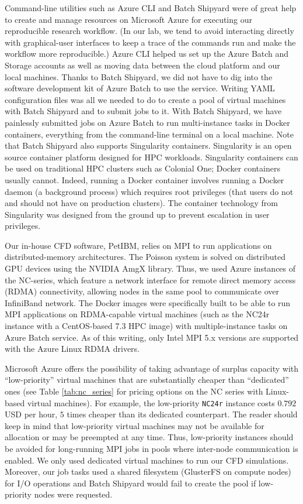 \documentclass[10pt,journal,compsoc]{IEEEtran}
\begin{document}
Command-line utilities such as Azure CLI and Batch Shipyard were of great help to create and manage resources on Microsoft Azure for executing our reproducible research workflow.
(In our lab, we tend to avoid interacting directly with graphical-user interfaces to keep a trace of the commands run and make the workflow more reproducible.)
Azure CLI helped us set up the Azure Batch and Storage accounts as well as moving data between the cloud platform and our local machines.
Thanks to Batch Shipyard, we did not have to dig into the software development kit of Azure Batch to use the service.
Writing YAML configuration files was all we needed to do to create a pool of virtual machines with Batch Shipyard and to submit jobs to it.
With Batch Shipyard, we have painlessly submitted jobs on Azure Batch to run multi-instance tasks in Docker containers, everything from the command-line terminal on a local machine.
Note that Batch Shipyard also supports Singularity containers.
Singularity is an open source container platform designed for HPC workloads.
Singularity containers can be used on traditional HPC clusters such as Colonial One; Docker containers usually cannot.
Indeed, running a Docker container involves running a Docker daemon (a background process) which requires root privileges (that users do not and should not have on production clusters).
The container technology from Singularity was designed from the ground up to prevent escalation in user privileges.

Our in-house CFD software, PetIBM, relies on MPI to run applications on distributed-memory architectures.
The Poisson system is solved on distributed GPU devices using the NVIDIA AmgX library.
Thus, we used Azure instances of the NC-series, which feature a network interface for remote direct memory access (RDMA) connectivity, allowing nodes in the same pool to communicate over InfiniBand network.
The Docker images were specifically built to be able to run MPI applications on RDMA-capable virtual machines (such as the NC24r instance with a CentOS-based 7.3 HPC image) with multiple-instance tasks on Azure Batch service.
As of this writing, only Intel MPI 5.x versions are supported with the Azure Linux RDMA drivers.

Microsoft Azure offers the possibility of taking advantage of surplus capacity with ``low-priority'' virtual machines that are substantially cheaper than ``dedicated'' ones (see Table \ref{tab:nc_series} for pricing options on the NC series with Linux-based virtual machines).
For example, the low-priority \texttt{NC24r} instance costs $0.792$ USD per hour, $5$ times cheaper than its dedicated counterpart.
The reader should keep in mind that low-priority virtual machines may not be available for allocation or may be preempted at any time.
Thus, low-priority instances should be avoided for long-running MPI jobs in pools where inter-node communication is enabled.
We only used dedicated virtual machines to run our CFD simulations.
Moreover, our job tasks used a shared filesystem (GlusterFS on compute nodes) for I/O operations and Batch Shipyard would fail to create the pool if low-priority nodes were requested.
\end{document}
